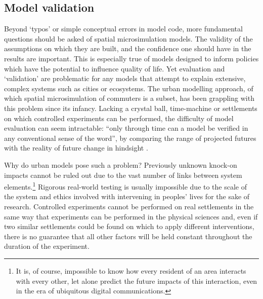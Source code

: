 \documentclass[a4paper, 11pt, twoside]{Thesis}
\begin{document}
\subsection{Model validation}
\label{meval}
Beyond `typos' or simple conceptual errors in model code, more fundamental
questions should be asked of spatial microsimulation models. The validity
of the assumptions on which they are built, and the confidence one should have
in the results are important. This is especially true of models designed to inform
policies which have the potential to influence quality of life. Yet
evaluation and `validation' are
 problematic for any models that attempt to explain extensive, complex
systems such as cities or ecosystems. The urban modelling approach, of which
spatial microsimulation of commuters is a subset, has been grappling with this
problem since its infancy. Lacking a crystal ball, time-machine or settlements
on which controlled experiments can be performed, the difficulty of model evaluation can
seem intractable: ``only through time can a model be verified in any
conventional sense of the word'', by comparing the range of projected futures
with the reality of future change in hindsight \citep[p.~15]{batty1976urban}.

Why do urban models pose such a problem? Previously unknown knock-on impacts
cannot be ruled out due to the vast number of links between system
elements.\footnote{It is, of course, impossible to know how every resident of
an area interacts with every other, let alone predict the future impacts of
this interaction, even in the era of ubiquitous digital communications.
}
Rigorous real-world testing is usually impossible due to the scale of the system
and ethics involved with intervening in peoples' lives for the sake of research.
Controlled experiments cannot be performed on real settlements in the
same way that experiments can be performed in the physical sciences and, even if
two similar settlements could be found on which to apply different
interventions, there is no guarantee that all other factors will be held
constant throughout the duration of the experiment. 
\end{document}
